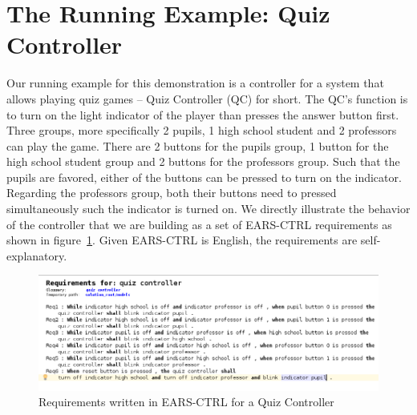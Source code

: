 \vspace{-.5cm}
\section{The Running Example: Quiz Controller}
\label{sec:example}
\vspace{-.3cm}
Our running example for this demonstration is a controller for a system that
allows playing quiz games -- Quiz Controller (QC) for short. The QC's
function is to turn on the light indicator of the player than presses the answer
button first. Three groups, more specifically 2 pupils, 1 high school student
and 2 professors can play the game. There are 2 buttons for the pupils group, 1
button for the high school student group and 2 buttons for the professors
group. Such that the pupils are favored, either of the buttons can be pressed to turn on the
indicator. Regarding the professors group, both their buttons need to pressed
simultaneously such the indicator is turned on. We directly illustrate the
behavior of the controller that we are building as a set of \textsf{EARS-CTRL} requirements as shown in figure~\ref{fig:QC_reqs}.
Given \textsf{EARS-CTRL} is English, the requirements are self-explanatory.
\begin{figure}[!h]
\centering
\includegraphics[width=1\textwidth]{./images/QC_Reqs.png}
\caption{Requirements written in \textsf{EARS-CTRL} for a Quiz Controller}
\label{fig:QC_reqs}
\vspace{-.5cm}
\end{figure}
